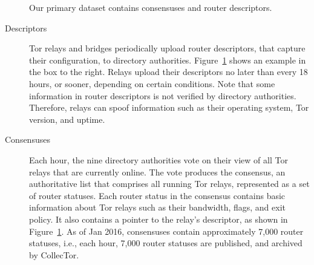 \begin{figure}[t]
\caption{Our primary dataset contains consensuses and router descriptors.}
\label{fig:datasets}
\end{figure}

\begin{description}
	\item[Descriptors] Tor relays and bridges periodically upload router
		descriptors, that capture their configuration, to directory authorities.
		Figure~\ref{fig:datasets} shows an example in the box to the right.
		Relays upload their descriptors no later than every 18 hours, or sooner,
		depending on certain conditions.  Note that some information in router
		descriptors is not verified by directory authorities.  Therefore, relays
		can spoof information such as their operating system, Tor version, and
		uptime.

	\item[Consensuses] Each hour, the nine directory authorities vote on their
		view of all Tor relays that are currently online.  The vote produces the
		consensus, an authoritative list that comprises all running Tor relays,
		represented as a set of router statuses.  Each router status in the
		consensus contains basic information about Tor relays such as their
		bandwidth, flags, and exit policy.  It also contains a pointer to the
		relay's descriptor, as shown in Figure~\ref{fig:datasets}.  As of Jan
		2016, consensuses contain approximately 7,000 router statuses, i.e.,
		each hour, 7,000 router statuses are published, and archived by
		CollecTor.
\end{description}

